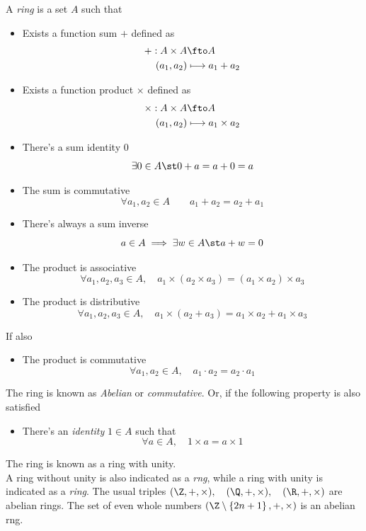 \documentclass[../mmf.tex]{subfiles}
\begin{document}
\begin{dfn}[Ring]
	A \textit{ring} is a set $A$ such that
	\begin{itemize}
	\item Exists a function sum $+$ defined as
		\begin{equation*}
			\begin{aligned}
				+:A\times A&\fto A\\
				(a_1, a_2)&\longmapsto a_1+a_2
			\end{aligned}
		\end{equation*}
	\item Exists a function product $\times$ defined as
		\begin{equation*}
			\begin{aligned}
				\times:A\times A&\fto A\\
				(a_1, a_2)&\longmapsto a_1\times a_2
			\end{aligned}
		\end{equation*}
	\item There's a sum identity $0$ $$\exists0\in A\st0+a=a+0=a$$
	\item The sum is commutative $$\forall a_1, a_2\in A\qquad a_1+a_2=a_2+a_1$$
	\item There's always a sum inverse $$a\in A\implies\exists w\in A\st a+w=0$$
	\item The product is associative $$\forall a_1, a_2, a_3\in A, \quad a_1\times(a_2\times a_3)=(a_1\times a_2)\times a_3$$
	\item The product is distributive $$\forall a_1, a_2, a_3\in A, \quad a_1\times(a_2+a_3)=a_1\times a_2+a_1\times a_3$$
	\end{itemize}
	If also
	\begin{itemize}
	\item The product is commutative $$\forall a_1, a_2\in A, \quad a_1\cdot a_2=a_2\cdot a_1$$
	\end{itemize}
	The ring is known as \textit{Abelian} or \textit{commutative}.
	Or, if the following property is also satisfied
	\begin{itemize}
	\item There's an \textit{identity} $1\in A$ such that
		$$\forall a\in A, \quad 1\times a= a\times 1$$
	\end{itemize}
	The ring is known as a ring with unity.\\
	A ring without unity is also indicated as a \textit{rng}, while a ring with unity is indicated as a \textit{ring}.
	The usual triples $(\Z, +, \times), \quad (\Q, +, \times), \quad (\R, +, \times)$ are abelian rings. The set of even whole numbers $(\Z\setminus\left\{ 2n+1 \right\}, +, \times)$ is an abelian rng.
\end{dfn}
\end{document}
